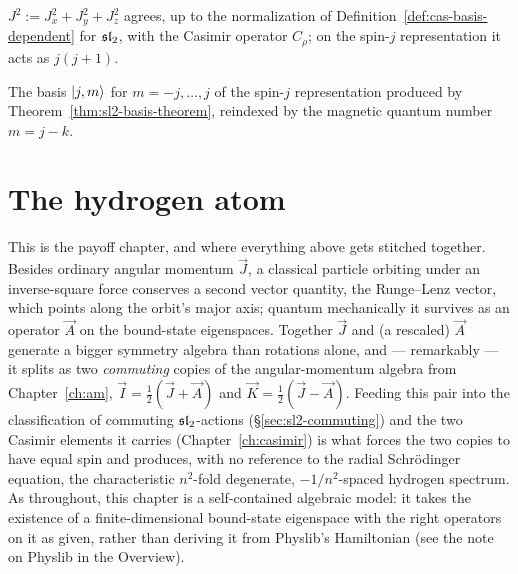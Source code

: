 \begin{theorem}
  \label{thm:am-j2-casimir}
  \leanok
  $J^2 := J_x^2+J_y^2+J_z^2$ agrees, up to the normalization of
  Definition~\ref{def:cas-basis-dependent} for $\mathfrak{sl}_2$, with the Casimir
  operator $C_\rho$; on the spin-$j$ representation it acts as $j(j+1)$.
\end{theorem}

\begin{definition}
  \label{def:am-magnetic-basis}
  \leanok
  The basis $\lvert j,m \rangle$ for $m = -j,\dots,j$ of the spin-$j$ representation
  produced by Theorem~\ref{thm:sl2-basis-theorem}, reindexed by the magnetic
  quantum number $m = j - k$.
\end{definition}

\chapter{The hydrogen atom}
\label{ch:hydrogen}

This is the payoff chapter, and where everything above gets stitched
together. Besides ordinary angular momentum $\vec J$, a classical particle
orbiting under an inverse-square force conserves a second vector quantity,
the Runge--Lenz vector, which points along the orbit's major axis; quantum
mechanically it survives as an operator $\vec A$ on the bound-state
eigenspaces. Together $\vec J$ and (a rescaled) $\vec A$ generate a bigger
symmetry algebra than rotations alone, and --- remarkably --- it splits as
two \emph{commuting} copies of the angular-momentum algebra from
Chapter~\ref{ch:am}, $\vec I = \tfrac12(\vec J+\vec A)$ and
$\vec K = \tfrac12(\vec J-\vec A)$. Feeding this pair into the classification
of commuting $\mathfrak{sl}_2$-actions (\S\ref{sec:sl2-commuting}) and the two Casimir
elements it carries (Chapter~\ref{ch:casimir}) is what forces the two
copies to have equal spin and produces, with no reference to the radial
Schr\"odinger equation, the characteristic $n^2$-fold degenerate,
$-1/n^2$-spaced hydrogen spectrum. As throughout, this chapter is a
self-contained algebraic model: it takes the existence of a
finite-dimensional bound-state eigenspace with the right operators on it as
given, rather than deriving it from Physlib's Hamiltonian (see the note on
Physlib in the Overview).

